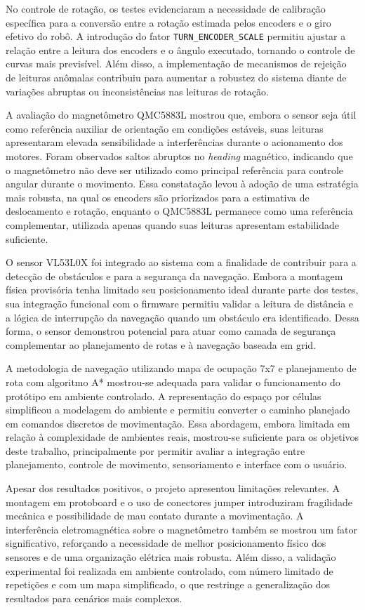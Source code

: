 \documentclass[	12pt, Times, openright, twoside, a4paper, english, brazil]{abntex2}
\begin{document}
No controle de rotação, os testes evidenciaram a necessidade de calibração específica para a conversão entre a rotação estimada pelos encoders e o giro efetivo do robô. A introdução do fator \texttt{TURN\_ENCODER\_SCALE} permitiu ajustar a relação entre a leitura dos encoders e o ângulo executado, tornando o controle de curvas mais previsível. Além disso, a implementação de mecanismos de rejeição de leituras anômalas contribuiu para aumentar a robustez do sistema diante de variações abruptas ou inconsistências nas leituras de rotação.

A avaliação do magnetômetro QMC5883L mostrou que, embora o sensor seja útil como referência auxiliar de orientação em condições estáveis, suas leituras apresentaram elevada sensibilidade a interferências durante o acionamento dos motores. Foram observados saltos abruptos no \textit{heading} magnético, indicando que o magnetômetro não deve ser utilizado como principal referência para controle angular durante o movimento. Essa constatação levou à adoção de uma estratégia mais robusta, na qual os encoders são priorizados para a estimativa de deslocamento e rotação, enquanto o QMC5883L permanece como uma referência complementar, utilizada apenas quando suas leituras apresentam estabilidade suficiente.

O sensor VL53L0X foi integrado ao sistema com a finalidade de contribuir para a detecção de obstáculos e para a segurança da navegação. Embora a montagem física provisória tenha limitado seu posicionamento ideal durante parte dos testes, sua integração funcional com o firmware permitiu validar a leitura de distância e a lógica de interrupção da navegação quando um obstáculo era identificado. Dessa forma, o sensor demonstrou potencial para atuar como camada de segurança complementar ao planejamento de rotas e à navegação baseada em grid.

A metodologia de navegação utilizando mapa de ocupação 7x7 e planejamento de rota com algoritmo A* mostrou-se adequada para validar o funcionamento do protótipo em ambiente controlado. A representação do espaço por células simplificou a modelagem do ambiente e permitiu converter o caminho planejado em comandos discretos de movimentação. Essa abordagem, embora limitada em relação à complexidade de ambientes reais, mostrou-se suficiente para os objetivos deste trabalho, principalmente por permitir avaliar a integração entre planejamento, controle de movimento, sensoriamento e interface com o usuário.

Apesar dos resultados positivos, o projeto apresentou limitações relevantes. A montagem em protoboard e o uso de conectores jumper introduziram fragilidade mecânica e possibilidade de mau contato durante a movimentação. A interferência eletromagnética sobre o magnetômetro também se mostrou um fator significativo, reforçando a necessidade de melhor posicionamento físico dos sensores e de uma organização elétrica mais robusta. Além disso, a validação experimental foi realizada em ambiente controlado, com número limitado de repetições e com um mapa simplificado, o que restringe a generalização dos resultados para cenários mais complexos.
\end{document}
